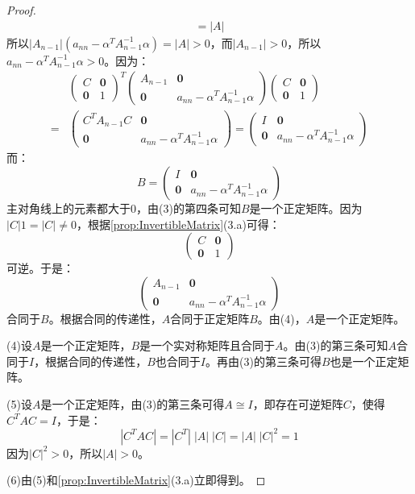 \begin{proof}
\begin{align*}
		=|A|
	\end{align*}
	所以$|A_{n-1}|(a_{nn}-\alpha^TA_{n-1}^{-1}\alpha)=|A|>0$，而$|A_{n-1}|>0$，所以$a_{nn}-\alpha^TA_{n-1}^{-1}\alpha>0$。因为：
	\begin{align*}
		&
		\begin{pmatrix}
			C & \mathbf{0} \\
			\mathbf{0} & 1
		\end{pmatrix}^T
		\begin{pmatrix}
			A_{n-1} & \mathbf{0} \\
			\mathbf{0} & a_{nn}-\alpha^TA_{n-1}^{-1}\alpha
		\end{pmatrix}
		\begin{pmatrix}
			C & \mathbf{0} \\
			\mathbf{0} & 1
		\end{pmatrix} \\
		=&
		\begin{pmatrix}
			C^TA_{n-1}C & \mathbf{0} \\
			\mathbf{0} & a_{nn}-\alpha^TA_{n-1}^{-1}\alpha
		\end{pmatrix}
		=
		\begin{pmatrix}
			I & \mathbf{0} \\
			\mathbf{0} & a_{nn}-\alpha^TA_{n-1}^{-1}\alpha
		\end{pmatrix}
	\end{align*}
	而：
	\begin{equation*}
		B=
		\begin{pmatrix}
			I & \mathbf{0} \\
			\mathbf{0} & a_{nn}-\alpha^TA_{n-1}^{-1}\alpha
		\end{pmatrix}
	\end{equation*}
	主对角线上的元素都大于$0$，由(3)的第四条可知$B$是一个正定矩阵。因为$|C|1=|C|\ne0$，根据\cref{prop:InvertibleMatrix}(3.a)可得：
	\begin{equation*}
		\begin{pmatrix}
			C & \mathbf{0} \\
			\mathbf{0} & 1
		\end{pmatrix}
	\end{equation*}
	可逆。于是：
	\begin{equation*}
		\begin{pmatrix}
			A_{n-1} & \mathbf{0} \\
			\mathbf{0} & a_{nn}-\alpha^TA_{n-1}^{-1}\alpha
		\end{pmatrix}
	\end{equation*}
	合同于$B$。根据合同的传递性，$A$合同于正定矩阵$B$。由(4)，$A$是一个正定矩阵。\par
	(4)设$A$是一个正定矩阵，$B$是一个实对称矩阵且合同于$A$。由(3)的第三条可知$A$合同于$I$，根据合同的传递性，$B$也合同于$I$。再由(3)的第三条可得$B$也是一个正定矩阵。\par
	(5)设$A$是一个正定矩阵，由(3)的第三条可得$A\cong I$，即存在可逆矩阵$C$，使得$C^TAC=I$，于是：
	\begin{equation*}
		|C^TAC|=|C^T|\;|A|\;|C|=|A|\;|C|^2=1
	\end{equation*}
	因为$|C|^2>0$，所以$|A|>0$。\par
	(6)由(5)和\cref{prop:InvertibleMatrix}(3.a)立即得到。
\end{proof}
